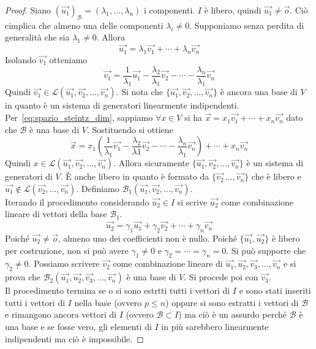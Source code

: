 \begin{proof}
  Siano ${(\vec{u_1})}_\mathscr{B}=(\lambda_1,\ldots,\lambda_n)$ i componenti. $I$ è
  libero, quindi $\vec{u_1}\neq\vec{o}$. Ciò cimplica che almeno una delle componenti
  $\lambda_i\neq0$. Supponiamo senza perdita di generalità che sia $\lambda_1\neq0$.
  Allora
  \begin{equation}\label{eq:spazio_steintz_dim}
    \vec{u_1}=\lambda_1\vec{v_1}+\cdots+\lambda_n\vec{v_n}\tag{$\star$}
  \end{equation}
  Isolando $\vec{v_1}$ otteniamo
  \begin{equation*}
    \vec{v_1} =
    \frac{1}{\lambda_1}\vec{u_1}-\frac{\lambda_2}{\lambda_1}\vec{v_2}-\cdots-
    \frac{\lambda_n}{\lambda_1}\vec{v_n}
  \end{equation*}
  Quindi $\vec{v_1}\in\mathscr{L}(\vec{u_1},\vec{v_2},\ldots,\vec{v_n})$. Si nota che
  $\{\vec{u_1},\vec{v_2},\ldots,\vec{v_n}\}$ è ancora una base di $V$ in quanto è un
  sistema di generatori linearmente indipendenti.\\
  Per~\eqref{eq:spazio_steintz_dim}, sappiamo $\forall x\in V$ si ha
  $\vec{x}=x_1\vec{v_1}+\cdots+x_n\vec{v_n}$ dato che $\mathscr{B}$ è una base di $V$.
  Sostituendo si ottiene
  \begin{equation*}
    \vec{x}=x_1 \left(
    \frac{1}{\lambda_1}\vec{v_1}-\frac{\lambda_2}{\lambda1}\vec{v_2}-\cdots-
  \frac{\lambda_n}{\lambda_1}\vec{v_n}\right)+\cdots+x_n\vec{v_n}
  \end{equation*}
  Quindi $x\in\mathscr{L}(\vec{u_1},\vec{v_2},\ldots,\vec{v_n})$. Allora sicuramente
  $\{\vec{u_1},\vec{v_2},\ldots,\vec{v_n}\}$ è un sistema di generatori di $V$. È anche
  libero in quanto è formato da $\{\vec{v_2}\,\ldots,\vec{v_n}\}$ che è libero e
  $\vec{u_1}\notin\mathscr{L}(\vec{v_2},\ldots,\vec{v_n})$. Definiamo
  $\mathscr{B}_1(\vec{u_1},\vec{v_2},\ldots,\vec{v_n})$.\\
  Iterando il procedimento considerando $\vec{u_2}\in I$ si scrive $\vec{u_2}$ come
  combinazione lineare di vettori della base $\mathscr{B}_1$.
  \begin{equation*}
    \vec{u_2}=\gamma_1\vec{u_1}+\gamma_2\vec{v_2}+\cdots+\gamma_n\vec{v_n}
  \end{equation*}
  Poiché $\vec{u_2}\neq\vec{o}$, almeno uno dei coefficienti non è nullo. Poiché
  $\{\vec{u_1},\vec{u_2}\}$ è libero per costruzione, non si può avere $\gamma_1\neq0$ e
  $\gamma_2=\cdots=\gamma_n=0$. Si può supporre che $\gamma_2\neq0$. Possiamo scrivere
  $\vec{v_2}$ come combinazione lineare di
  $\vec{u_1},\vec{u_2},\vec{v_3},\ldots,\vec{v_n}$ e si prova che
  $\mathscr{B}_2(\vec{u_1},\vec{u_2},\vec{v_3},\ldots,\vec{v_n})$ è una base di $V$. Si
  procede poi con $\vec{v_3}$.\\
  Il procedimento termina se o si sono estrtti tutti i vettori di $I$ e sono stati
  inseriti tutti i vettori di $I$ nella base (ovvero $p\leq n$) oppure si sono estratti
  i vettori di $\mathscr{B}$ e rimangono ancora vettori di $I$ (ovvero
  $\mathscr{B}\subset I$) ma ciò è un assurdo perché $\mathscr{B}$ è una base e se fosse
  vero, gli elementi di $I$ in più sarebbero linearmente indipendenti ma ciò è
  impossibile.
\end{proof}

